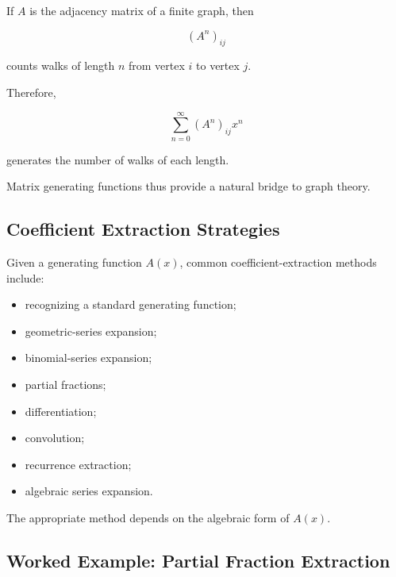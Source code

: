 If \(A\) is the adjacency matrix of a finite graph, then

\[
(A^n)_{ij}
\]

counts walks of length \(n\) from vertex \(i\) to vertex \(j\).

Therefore,

\[
\boxed{
\sum_{n=0}^{\infty}
(A^n)_{ij}x^n
}
\]

generates the number of walks of each length.

Matrix generating functions thus provide a natural bridge to graph
theory.

\subsection{Coefficient Extraction Strategies}
\label{subsec:coefficient-extraction-strategies}

Given a generating function \(A(x)\), common coefficient-extraction
methods include:

\begin{itemize}
    \item recognizing a standard generating function;
    \item geometric-series expansion;
    \item binomial-series expansion;
    \item partial fractions;
    \item differentiation;
    \item convolution;
    \item recurrence extraction;
    \item algebraic series expansion.
\end{itemize}

The appropriate method depends on the algebraic form of \(A(x)\).

\subsection{Worked Example: Partial Fraction Extraction}
\label{subsec:worked-partial-fraction-extraction}

